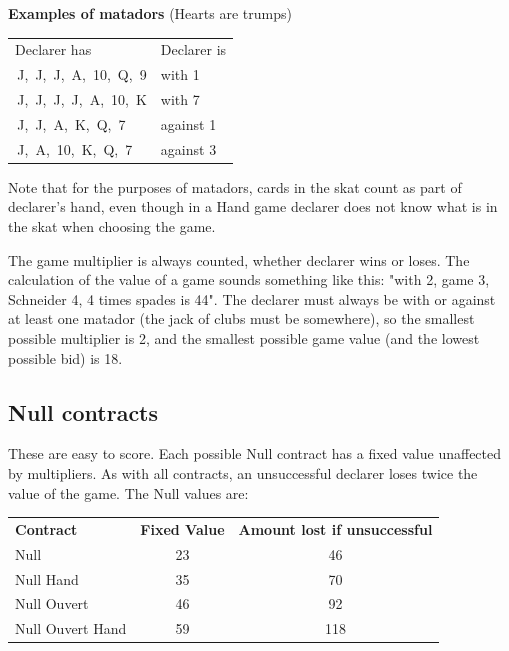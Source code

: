 \documentclass[letter]{article}
\newcommand{\clubs}{{\larger[2]\Pisymbol{psy}{"A7}}}
\newcommand{\spades}{{\larger[2]\Pisymbol{psy}{"AA}}}
\newcommand{\hearts}{{\larger[2]\color{red}\Pisymbol{psy}{"A9}}}
\newcommand{\diamonds}{{\larger[2]\color{red}\Pisymbol{psy}{"A8}}}
\newcommand{\clubsX}[1]{\clubs\,#1}
\newcommand{\spadesX}[1]{\spades\,#1}
\newcommand{\heartsX}[1]{\hearts\,#1}
\newcommand{\diamondsX}[1]{\diamonds\,#1}
\begin{document}
  {\bfseries Examples of matadors} (Hearts are trumps)

  \begin{tabular}{l l}
    Declarer has & Declarer is \\
    \clubsX{J}, \heartsX{J}, \diamondsX{J}, \heartsX{A}, \heartsX{10},
        \heartsX{Q}, \heartsX{9} & with 1 \\
    \clubsX{J}, \spadesX{J}, \heartsX{J}, \diamondsX{J}, \heartsX{A},
        \heartsX{10}, \heartsX{K} & with 7 \\
    \spadesX{J}, \heartsX{J}, \heartsX{A}, \heartsX{K}, \heartsX{Q},
        \heartsX{7} & against 1 \\
    \diamondsX{J}, \heartsX{A}, \heartsX{10}, \heartsX{K}, \heartsX{Q},
      \heartsX{7} & against 3 \\
  \end{tabular}

  Note that for the purposes of matadors, cards in the skat count as part of
  declarer's hand, even though in a Hand game declarer does not know what is in
  the skat when choosing the game.

  The game multiplier is always counted, whether declarer wins or loses. The
  calculation of the value of a game sounds something like this: "with 2, game
  3, Schneider 4, 4 times spades is 44". The declarer must always be with or
  against at least one matador (the jack of clubs must be somewhere), so the
  smallest possible multiplier is 2, and the smallest possible game value (and
  the lowest possible bid) is 18.

  \subsection*{Null contracts}

  These are easy to score. Each possible Null contract has a fixed value
  unaffected by multipliers. As with all contracts, an unsuccessful declarer
  loses twice the value of the game. The Null values are:

  \begin{tabular}{l c c}
    {\bfseries Contract} & {\bfseries Fixed Value} & {\bfseries Amount lost if
        unsuccessful} \\
    Null & 23 & 46 \\
    Null Hand & 35 & 70 \\
    Null Ouvert & 46 & 92 \\
    Null Ouvert Hand & 59 & 118 \\
  \end{tabular}
\end{document}
